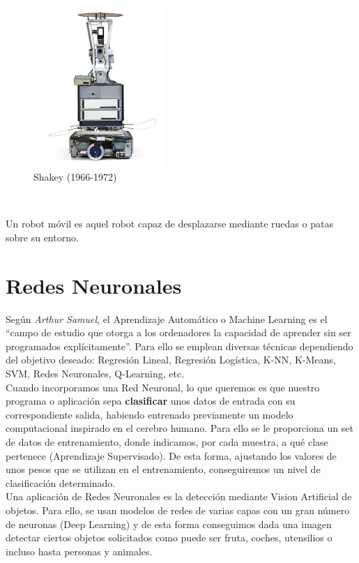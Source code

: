 \begin{figure} [h!]
  \begin{center}
    \includegraphics[width=5cm]{imagenes/shakey.jpg}
  \end{center}
  \caption{Shakey (1966-1972) \cite{shakey-the-robot}}
  \label{fig:shakey}
\end{figure}\

Un robot móvil es aquel robot capaz de desplazarse mediante ruedas o patas sobre su entorno.

\section{Redes Neuronales}
\label{sec:redes_neuronales}

Según \emph{Arthur Samuel}, el Aprendizaje Automático o Machine Learning es el ``campo de estudio que otorga a los ordenadores la capacidad de aprender sin ser programados explícitamente''. Para ello se emplean diversas técnicas dependiendo del objetivo deseado: Regresión Lineal, Regresión Logística, K-NN, K-Means, SVM, Redes Neuronales, Q-Learning, etc.
\\

Cuando incorporamos una Red Neuronal, lo que queremos es que nuestro programa o aplicación sepa \textbf{clasificar} unos datos de entrada con su correspondiente salida, habiendo entrenado previamente un modelo computacional inspirado en el cerebro humano. Para ello se le proporciona un set de datos de entrenamiento, donde indicamos, por cada muestra, a qué clase pertenece (Aprendizaje Supervisado). De esta forma, ajustando los valores de unos pesos que se utilizan en el entrenamiento, conseguiremos un nivel de clasificación determinado.\\

Una aplicación de Redes Neuronales es la detección mediante Vision Artificial de objetos. Para ello, se usan modelos de redes de varias capas con un gran número de neuronas (Deep Learning) y de esta forma conseguimos dada una imagen detectar ciertos objetos solicitados como puede ser fruta, coches, utensilios o incluso hasta personas y animales.\\

